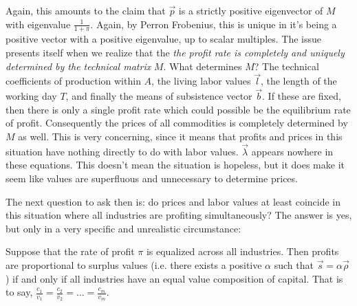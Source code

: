 Again, this amounts to the claim that $\vec{p}$ is a strictly positive eigenvector of $M$ with eigenvalue $\frac{1}{1+\pi}$. Again, by Perron Frobenius, this is unique in it's being a positive vector with a positive eigenvalue, up to scalar multiples. The issue presents itself when we realize that the \emph{the profit rate is completely and uniquely determined by the technical matrix} $M$. What determines $M$? The technical coefficients of production within $A$, the living labor values $\vec{l}$, the length of the working day $T$, and finally the means of subsistence vector $\vec{b}$. If these are fixed, then there is only a single profit rate which could possible be the equilibrium rate of profit. Consequently the prices of all commodities is completely determined by $M$ as well. This is very concerning, since it means that profits and prices in this situation have nothing directly to do with labor values. $\vec{\lambda}$ appears nowhere in these equations. This doesn't mean the situation is hopeless, but it does make it seem like values are superfluous and unnecessary to determine prices. \par 
The next question to ask then is: do prices and labor values at least coincide in this situation where all industries are profiting simultaneously? The answer is yes, but only in a very specific and unrealistic circumstance: 
\begin{theorem}
	Suppose that the rate of profit $\pi$ is equalized across all industries. Then profits are proportional to surplus values (i.e. there exists a positive $\alpha$ such that $\vec{s} = \alpha\vec{\rho}$) if and only if all industries have an equal value composition of capital. That is to say, $\frac{c_1}{v_1} = \frac{c_2}{v_2} = \ldots = \frac{c_m}{v_m}$. 
\end{theorem}
